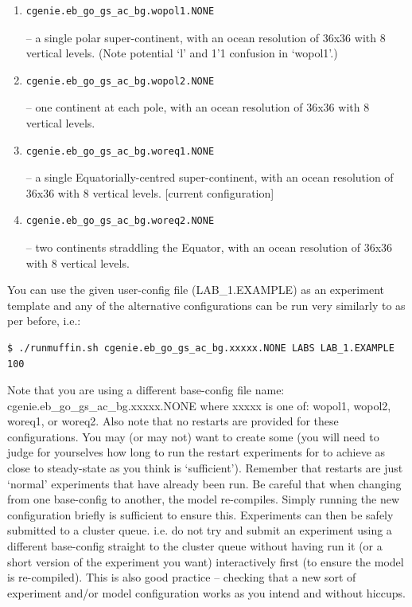 \documentclass[11pt,fleqn]{book} %
\begin{document}
\begin{enumerate}[noitemsep]
\setlength{\itemindent}{.2in}
\item 
\begin{verbatim}
cgenie.eb_go_gs_ac_bg.wopol1.NONE
\end{verbatim}
 – a single polar super-continent, with an ocean resolution of 36x36 with 8 vertical levels. (Note potential ‘l’ and 1’1 confusion in ‘wopol1’.)
\item
\begin{verbatim}
cgenie.eb_go_gs_ac_bg.wopol2.NONE
\end{verbatim}
  – one continent at each pole, with an ocean resolution of 36x36 with 8 vertical levels.
\item
\begin{verbatim}
cgenie.eb_go_gs_ac_bg.woreq1.NONE
\end{verbatim}
  – a single Equatorially-centred super-continent, with an ocean resolution of 36x36 with 8 vertical levels. [current configuration]
\item 
\begin{verbatim}
cgenie.eb_go_gs_ac_bg.woreq2.NONE
\end{verbatim}
 – two continents straddling the Equator, with an ocean resolution of 36x36 with 8 vertical levels.
\end{enumerate}
   
You can use the given user-config file (LAB\_1.EXAMPLE) as an experiment template and any of the alternative configurations can be run very similarly to as per before, i.e.:

\begin{verbatim}
$ ./runmuffin.sh cgenie.eb_go_gs_ac_bg.xxxxx.NONE LABS LAB_1.EXAMPLE 100
\end{verbatim}

Note that you are using a different base-config file name: cgenie.eb\_go\_gs\_ac\_bg.xxxxx.NONE where xxxxx is one of: wopol1, wopol2, woreq1, or woreq2. 
Also note that no restarts are provided for these configurations. You may (or may not) want to create some (you will need to judge for yourselves how long to run the restart experiments for to achieve as close to steady-state as you think is ‘sufficient’). Remember that restarts are just ‘normal’ experiments that have already been run.
Be careful that when changing from one base-config to another, the model re-compiles. Simply running the new configuration briefly is sufficient to ensure this. Experiments can then be safely submitted to a cluster queue. i.e. do not try and submit an experiment using a different base-config straight to the cluster queue without having run it (or a short version of the experiment you want) interactively first (to ensure the model is re-compiled). This is also good practice – checking that a new sort of experiment and/or model configuration works as you intend and without hiccups.
\end{document}
